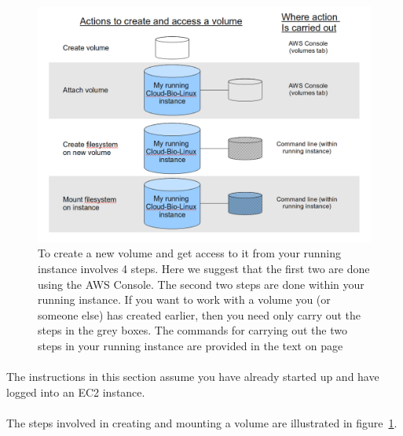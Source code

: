 \begin{figure}[!ht]
	\fbox
	{
		\begin{minipage}{13cm}
			\includegraphics[width=\maxwidth]{"images/createAndMountVol-1"}
			\caption[Attaching a volume]{\label{fig:createandmountvolume}To create a new volume and get access to it from your running instance involves 4 steps. Here we suggest that the first two are done using the AWS Console. The second two steps are done within your running instance. If you want to work with a volume you (or someone else) has created earlier, then you need only carry out the steps in the grey boxes. The commands for carrying out the two steps in your running instance are provided in the text on page \pageref{text:mounting}}
		\end{minipage}
	}
\end{figure}


\paragraph{}The instructions in this section assume you have already started up and have logged into an EC2 instance. 
\paragraph{}The steps involved in creating and mounting a volume are illustrated in figure~\ref{fig:createandmountvolume}.

